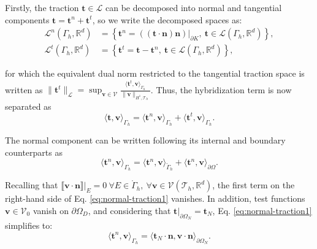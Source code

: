 \documentclass[english,11pt,3p,number,sort&compress]{elsarticle}
\newcommand{\jump}[1]
{
	\llbracket #1 \rrbracket
}
\begin{document}
Firstly, the traction $\bm{t} \in \mathcal{L}$ can be decomposed into normal and tangential components $\bm{t} = \bm{t}^n + \bm{t}^t$, so we write the decomposed spaces as:
\begin{subequations}
	\begin{align}
		\mathcal{L}^n(\Gamma_h,\mathbb{R}^d) &= \left\{\bm{t}^n=((\bm{t}\cdot\bm{n})\bm{n})\lvert_{\partial K}, ~\bm{t} \in \mathcal{L}(\Gamma_h,\mathbb{R}^d) \right\} , \label{eq:space-traction-normal}\\
		\mathcal{L}^t(\Gamma_h,\mathbb{R}^d) &= \left\{\bm{t}^t=\bm{t}-\bm{t}^n, ~\bm{t} \in \mathcal{L}(\Gamma_h,\mathbb{R}^d) \right\} , \label{eq:space-traction-tangential}
	\end{align}
\end{subequations}

\noindent for which the equivalent dual norm restricted to the tangential traction space is written as $\lVert\bm{t}^t\rVert_{\mathcal{L}}=\sup_{\bm{v}\in\mathcal{V}}\frac{\langle\bm{t}^t,\bm{v} \rangle_{\Gamma_h}}{\lVert\bm{v}\rVert_{H^1,\mathcal{T}_h}}$. Thus, the hybridization term is now separated as
\begin{equation} \label{eq:traction-decomposed}
	\langle\bm{t},\bm{v}\rangle_{\Gamma_h}=\langle\bm{t}^n,\bm{v}\rangle_{\Gamma_h}+\langle\bm{t}^t,\bm{v}\rangle_{\Gamma_h} .
\end{equation}

\noindent The normal component can be written following its internal and boundary counterparts as
\begin{equation} \label{eq:normal-traction1}
	\langle\bm{t}^n,\bm{v}\rangle_{\Gamma_h} = \langle\bm{t}^n,\bm{v}\rangle_{\mathring{\Gamma}_h} + \langle\bm{t}^n,\bm{v}\rangle_{\partial\Omega} .
\end{equation}

\noindent Recalling that $\jump{\bm{v\cdot\bm{n}}}\lvert_E=0 ~\forall E \in \mathring{\Gamma}_h, ~\forall \bm{v}\in \mathcal{V}(\mathcal{T}_h,\mathbb{R}^d)$, the first term on the right-hand side of Eq. \eqref{eq:normal-traction1} vanishes. In addition, test functions $\bm{v} \in \mathcal{V}_0$ vanish on $\partial\Omega_D$, and considering that $\bm{t}\lvert_{\partial\Omega_N}=\bm{t}_N$, Eq. \eqref{eq:normal-traction1} simplifies to:
\begin{equation} \label{eq:normal-traction2}
	\langle\bm{t}^n,\bm{v}\rangle_{\Gamma_h} = \langle\bm{t}_N\cdot\bm{n},\bm{v}\cdot\bm{n}\rangle_{\partial\Omega_N} .
\end{equation}
\end{document}
